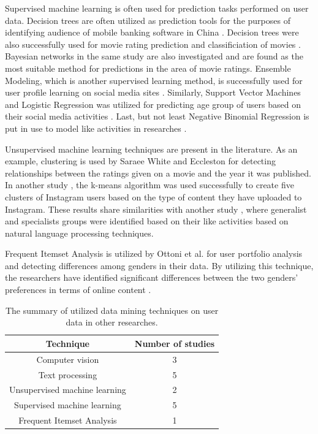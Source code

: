   Supervised machine learning is often used for prediction tasks performed on user data. Decision trees are often utilized as prediction tools for the purposes of identifying audience of mobile banking software in China \cite{chinesemobilebankingusers}. Decision trees were also successfully used for movie rating prediction \cite{saraee2004data} and classificiation of movies \cite{kabinsingha2012movie}. Bayesian networks in the same study \cite{kabinsingha2012movie} are also investigated and are found as the most suitable method for predictions in the area of movie ratings. Ensemble Modeling, which is another supervised learning method, is successfully used for user profile learning on social media sites \cite{farseev2015harvestingmultiplesources}. Similarly, Support Vector Machines and Logistic Regression was utilized for predicting age group of users based on their social media activities \cite{han2016teensarefrommars}. Last, but not least Negative Binomial Regression is put in use to model like activities in researches \cite{jang2015no, bakhshi2014faces}.

  Unsupervised machine learning techniques are present in the literature. As an example, clustering is used by Saraee White and Eccleston \cite{saraee2004data} for detecting relationships between the ratings given on a movie and the year it was published. In another study \cite{hu2014we}, the k-means algorithm was used successfully to create five clusters of Instagram users based on the type of content they have uploaded to Instagram. These results share similarities with another study \cite{jang2015no}, where generalist and specialists groups were identified based on their like activities based on natural language processing techniques. 

Frequent Itemset Analysis is utilized by Ottoni et al. \cite{ottoni2013ladies} for user portfolio analysis and detecting differences among genders in their data. By utilizing this technique, the researchers have identified significant differences between the two genders' preferences in terms of online content \cite{ottoni2013ladies}. 

\begin{table}[!t]
  \centering
    \begin{tabular}{c||c}
      Technique & Number of studies \\ 
      \hline
      Computer vision & 3  \\
      Text processing & 5 \\
      Unsupervised machine learning & 2 \\
      Supervised machine learning & 5 \\
      Frequent Itemset Analysis & 1
    \end{tabular}
    \caption{The summary of utilized data mining techniques on user data in other researches.}
    \label{table_of_techniques}
\end{table}

